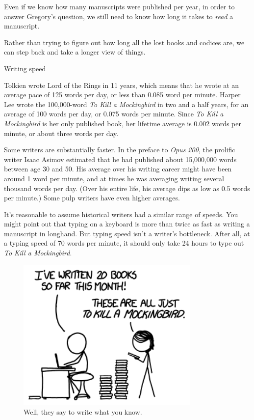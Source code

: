{{Even if we know how many manuscripts were published per year, in order to answer Gregory's question, we still need to know how long it takes to \emph{read} a manuscript.}

{Rather than trying to figure out how long all the lost books and codices are, we can step back and take a longer view of things.}

{Writing speed}

{Tolkien wrote Lord of the Rings in 11 years, which means that he wrote at an average pace of 125 words per day, or less than 0.085 word per minute. Harper Lee wrote the 100,000-word \emph{To Kill a Mockingbird} in two and a half years, for an average of 100 words per day, or 0.075 words per minute. Since \emph{To Kill a Mockingbird} is her only published book, her lifetime average is 0.002 words per minute, or about three words per day.}

{Some writers are substantially faster. In the preface to \emph{Opus 200}, the prolific writer Isaac Asimov estimated that he had published about 15,000,000 words between age 30 and 50. His average over his writing career might have been around 1 word per minute, and at times he was averaging writing several thousand words per day. (Over his entire life, his average dips as low as 0.5 words per minute.) Some pulp writers have even higher averages.}

{It's reasonable to assume historical writers had a similar range of speeds. You might point out that typing on a keyboard is more than twice as fast as writing a manuscript in longhand. But typing speed isn't a writer's bottleneck. After all, at a typing speed of 70 words per minute, it should only take 24 hours to type out \emph{To Kill a Mockingbird}.}

\begin{figure}[!htbp]
\centering
\includegraphics[scale=0.5, max width=0.8\textwidth]{imgs/a/76/books_tkamps.png}
\caption{Well, they say to write what you know.}
\end{figure}

}
